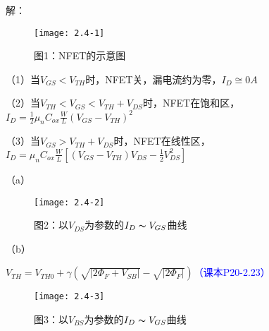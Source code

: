



解：

	\begin{figure}[H] %
	\centering %
	\begin{minipage}{\linewidth}
		\texttt{[image: 2.4-1]}
	\end{minipage}
	\caption*{图1：NFET的示意图} %
\end{figure}

（1）当$V_{GS}<V_{TH}$时，NFET关，漏电流约为零，$I_D\cong0A$

（2）当$V_{TH}<V_{GS}<V_{TH}+V_{DS}$时，NFET在饱和区，$I_D=\frac{1}{2}\mu_nC_{ox}\frac{W}{L}(V_{GS}-V_{TH})^2$

（3）当$V_{GS}>V_{TH}+V_{DS}$时，NFET在线性区，$I_D=\mu_nC_{ox}\frac{W}{L}[(V_{GS}-V_{TH})V_{DS}-\frac{1}{2}V_{DS}^2]$

（a）

	\begin{figure}[H] %
	\centering %
	\begin{minipage}{\linewidth}
		\texttt{[image: 2.4-2]}
	\end{minipage}
	\caption*{图2：以$V_{DS}$为参数的$I_D \thicksim V_{GS}$曲线} %
\end{figure}

（b）

$V_{TH}=V_{TH0}+\gamma(\sqrt{|2\Phi_F+V_{SB}|}-\sqrt{|2\Phi_F|})$\textcolor{blue}{（课本P20-2.23）}

\begin{figure}[H] %
	\centering %
	\begin{minipage}{\linewidth}
		\texttt{[image: 2.4-3]}
	\end{minipage}
	\caption*{图3：以$V_{BS}$为参数的$I_D \thicksim V_{GS}$曲线} %
\end{figure}
